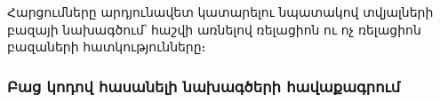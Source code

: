 {
    Հարցումները արդյունավետ կատարելու նպատակով տվյալների բազայի նախագծում՝ հաշվի առնելով ռելացիոն ու ոչ ռելացիոն բազաների հատկությունները։

    \subsubsection{Բաց կոդով հասանելի նախագծերի հավաքագրում}\label{subsubsec:sourceCodes}
    
}
